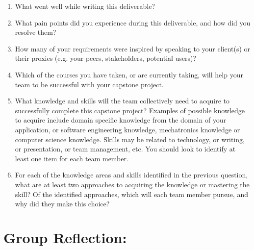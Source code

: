 \begin{enumerate}
  \item What went well while writing this deliverable? 
  \item What pain points did you experience during this deliverable, and how did
  you resolve them?
  \item How many of your requirements were inspired by speaking to your
  client(s) or their proxies (e.g. your peers, stakeholders, potential users)?
  \item Which of the courses you have taken, or are currently taking, will help
  your team to be successful with your capstone project.
  \item What knowledge and skills will the team collectively need to acquire to
  successfully complete this capstone project?  Examples of possible knowledge
  to acquire include domain specific knowledge from the domain of your
  application, or software engineering knowledge, mechatronics knowledge or
  computer science knowledge.  Skills may be related to technology, or writing,
  or presentation, or team management, etc.  You should look to identify at
  least one item for each team member.
  \item For each of the knowledge areas and skills identified in the previous
  question, what are at least two approaches to acquiring the knowledge or
  mastering the skill?  Of the identified approaches, which will each team
  member pursue, and why did they make this choice?

\end{enumerate}

  \section{Group Reflection:}

